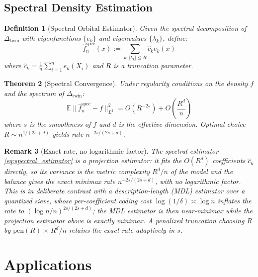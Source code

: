 \documentclass[11pt]{article}
\newtheorem{theorem}{Theorem}[section]
\newtheorem{definition}[theorem]{Definition}
\newtheorem{remark}[theorem]{Remark}
\newcommand{\E}{\mathbb{E}}
\begin{document}
\subsection{Spectral Density Estimation}

\begin{definition}[Spectral Orbital Estimator]\label{def:spectral_estimator}
Given the spectral decomposition of $\Delta_{\mathrm{twin}}$ with eigenfunctions $\{e_k\}$ and eigenvalues $\{\lambda_k\}$, define:
\begin{equation}\label{eq:spectral_estimator}
\hat{f}_n^{\mathrm{spec}}(x) := \sum_{k : |\lambda_k| \leq R} \hat{c}_k e_k(x)
\end{equation}
where $\hat{c}_k = \frac{1}{n} \sum_{i=1}^n e_k(X_i)$ and $R$ is a truncation parameter.
\end{definition}

\begin{theorem}[Spectral Convergence]\label{thm:spectral_convergence}
Under regularity conditions on the density $f$ and the spectrum of $\Delta_{\mathrm{twin}}$:
\begin{equation}\label{eq:spectral_rate}
\E\|\hat{f}_n^{\mathrm{spec}} - f\|_{L^2}^2 = O(R^{-2s}) + O\left( \frac{R^d}{n} \right)
\end{equation}
where $s$ is the smoothness of $f$ and $d$ is the effective dimension. Optimal choice $R \sim n^{1/(2s+d)}$ yields rate $n^{-2s/(2s+d)}$.
\end{theorem}

\begin{remark}[Exact rate, no logarithmic factor]
The spectral estimator \eqref{eq:spectral_estimator} is a \emph{projection}
estimator: it fits the $O(R^d)$ coefficients $\hat c_k$ directly, so its variance
is the metric complexity $R^d/n$ of the model and the balance gives the
\emph{exact} minimax rate $n^{-2s/(2s+d)}$, with no logarithmic factor. This is in
deliberate contrast with a description-length (MDL) estimator over a quantized
sieve, whose per-coefficient coding cost $\log(1/\delta)\asymp\log n$ inflates the
rate to $(\log n/n)^{2s/(2s+d)}$; the MDL estimator is then near-minimax while the
projection estimator above is exactly minimax. A penalized truncation choosing $R$
by $\mathrm{pen}(R)\asymp R^d/n$ retains the exact rate \emph{adaptively} in $s$.
\end{remark}

\section{Applications}
\label{sec:applications}
\end{document}
